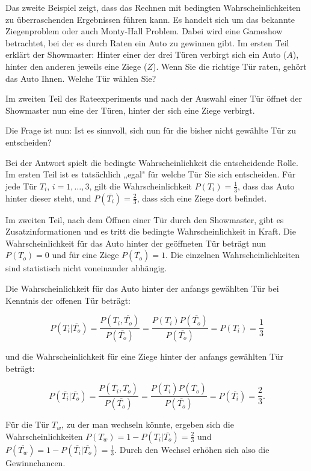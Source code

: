 \begin{gedankenexperiment}
Das zweite Beispiel zeigt, dass das Rechnen mit bedingten Wahrscheinlichkeiten zu überraschenden Ergebnissen führen kann. Es handelt sich um das bekannte Ziegenproblem oder auch Monty-Hall Problem. Dabei wird eine Gameshow betrachtet, bei der es durch Raten ein Auto zu gewinnen gibt. Im ersten Teil erklärt der Showmaster: Hinter einer der drei Türen verbirgt sich ein Auto ($A$), hinter den anderen jeweils eine Ziege ($Z$). Wenn Sie die richtige Tür raten, gehört das Auto Ihnen. Welche Tür wählen Sie?


Im zweiten Teil des Rateexperiments und nach der Auswahl einer Tür öffnet der Showmaster nun eine der Türen, hinter der sich eine Ziege verbirgt.

Die Frage ist nun: Ist es sinnvoll, sich nun für die bisher nicht gewählte Tür zu entscheiden?

Bei der Antwort spielt die bedingte Wahrscheinlichkeit die entscheidende Rolle. Im ersten Teil ist es tatsächlich „egal" für welche Tür Sie sich entscheiden. Für jede Tür $T_i$, $i = 1, \ldots, 3$, gilt die Wahrscheinlichkeit $P(T_i) = \frac{1}{3}$, dass das Auto hinter dieser steht, und $P(\overline{T_i}) = \frac{2}{3}$, dass sich eine Ziege dort befindet.

Im zweiten Teil, nach dem Öffnen einer Tür durch den Showmaster, gibt es Zusatzinformationen und es tritt die bedingte Wahrscheinlichkeit in Kraft. Die Wahrscheinlichkeit für das Auto hinter der geöffneten Tür beträgt nun $P(T_o) = 0$ und für eine Ziege $P(\overline{T_o}) = 1$. Die einzelnen Wahrscheinlichkeiten sind statistisch nicht voneinander abhängig.

Die Wahrscheinlichkeit für das Auto hinter der anfangs gewählten Tür bei Kenntnis der offenen Tür beträgt:

$$
P(T_i|\overline{T_o}) = \frac{P(T_i, \overline{T_o})}{P(\overline{T_o})} = \frac{P(T_i)P(\overline{T_o})}{P(\overline{T_o})} = P(T_i) = \frac{1}{3}
$$

und die Wahrscheinlichkeit für eine Ziege hinter der anfangs gewählten Tür beträgt:

$$
P(\overline{T_i}|\overline{T_o}) = \frac{P(\overline{T_i}, \overline{T_o})}{P(\overline{T_o})} = \frac{P(\overline{T_i})P(\overline{T_o})}{P(\overline{T_o})} = P(\overline{T_i}) = \frac{2}{3}.
$$

Für die Tür $T_w$, zu der man wechseln könnte, ergeben sich die Wahrscheinlichkeiten $P(T_w) = 1 - P(T_i|\overline{T_o}) = \frac{2}{3}$ und $P(\overline{T_w}) = 1 - P(\overline{T_i}|\overline{T_o}) = \frac{1}{3}$. Durch den Wechsel erhöhen sich also die Gewinnchancen.
\end{gedankenexperiment}

